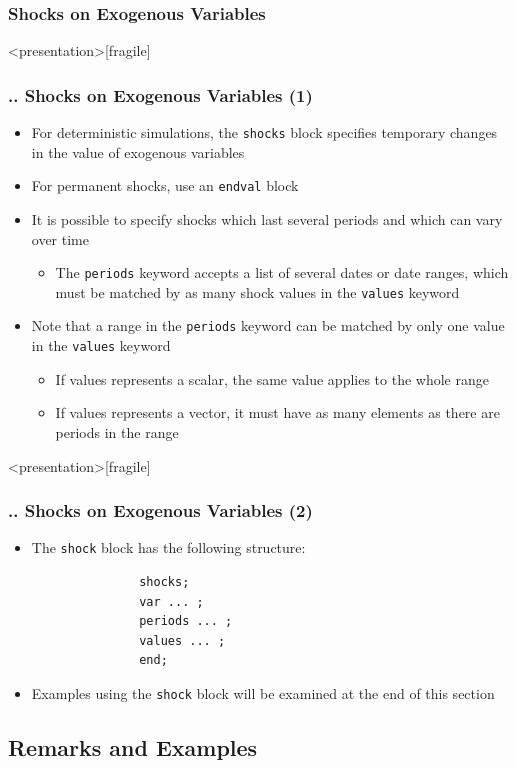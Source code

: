 \documentclass[11pt,aspectratio=169]{beamer}
\begin{document}
\subsubsection{Shocks on Exogenous Variables}
\begin{frame}<presentation>[fragile]
	\frametitle{{\thesection.\thesubsection.\thesubsubsection} Shocks on Exogenous Variables (1)}
	\begin{itemize}
		\item For deterministic simulations, the \texttt{shocks} block specifies temporary changes in the value of exogenous variables 
		\item For permanent shocks, use an \texttt{endval} block
		\item It is possible to specify shocks which last several periods and which can vary over time  
		\begin{itemize}
			\item The \texttt{periods} keyword accepts a list of several dates or date ranges, which must be matched by as many shock values in the \texttt{values} keyword
		\end{itemize}
		\item Note that a range in the \texttt{periods} keyword can be matched by only one value in the \texttt{values} keyword  
		\begin{itemize}
			\item If values represents a scalar, the same value applies to the whole range
			\item If values represents a vector, it must have as many elements as there are periods in the range
		\end{itemize}
	\end{itemize}
\end{frame}
\begin{frame}<presentation>[fragile]
	\frametitle{{\thesection.\thesubsection.\thesubsubsection} Shocks on Exogenous Variables (2)}
	\begin{itemize}
		\item The \texttt{shock} block has the following structure:
			\begin{verbatim}
			   shocks;
			   var ... ;
			   periods ... ;
			   values ... ;
			   end;
			\end{verbatim}
		\item Examples using the \texttt{shock} block will be examined at the end of this section
	\end{itemize}
\end{frame}
\subsection{Remarks and Examples}
\end{document}
